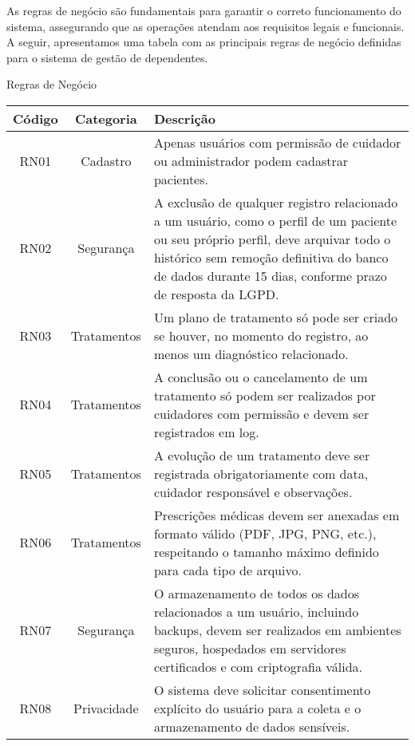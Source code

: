 As regras de negócio são fundamentais para garantir o correto funcionamento do sistema, assegurando que as operações atendam aos requisitos legais e funcionais. A seguir, apresentamos uma tabela com as principais regras de negócio definidas para o sistema de gestão de dependentes.

\renewcommand{\arraystretch}{1.5} %

\begin{quadro}
    \caption{\label{quadro_regras_negocio}Regras de Negócio}
    \begin{tabular}{|c|c|p{10cm}|}
        \hline
        \textbf{Código} & \textbf{Categoria} & \textbf{Descrição} \\ \hline
        RN01   & Cadastro     & Apenas usuários com permissão de cuidador ou administrador podem cadastrar pacientes. \\ \hline
        RN02   & Segurança   & A exclusão de qualquer registro relacionado a um usuário, como o perfil de um paciente ou seu próprio perfil, deve arquivar todo o histórico sem remoção definitiva do banco de dados durante 15 dias, conforme prazo de resposta da LGPD. \\ \hline
        RN03   & Tratamentos & Um plano de tratamento só pode ser criado se houver, no momento do registro, ao menos um diagnóstico relacionado. \\ \hline
        RN04   & Tratamentos & A conclusão ou o cancelamento de um tratamento só podem ser realizados por cuidadores com permissão e devem ser registrados em log. \\ \hline
        RN05   & Tratamentos & A evolução de um tratamento deve ser registrada obrigatoriamente com data, cuidador responsável e observações. \\ \hline
        RN06   & Tratamentos & Prescrições médicas devem ser anexadas em formato válido (PDF, JPG, PNG, etc.), respeitando o tamanho máximo definido para cada tipo de arquivo. \\ \hline
        RN07   & Segurança   & O armazenamento de todos os dados relacionados a um usuário, incluindo backups, devem ser realizados em ambientes seguros, hospedados em servidores certificados e com criptografia válida. \\ \hline
        RN08   & Privacidade & O sistema deve solicitar consentimento explícito do usuário para a coleta e o armazenamento de dados sensíveis. \\ \hline
    \end{tabular}
\end{quadro}
